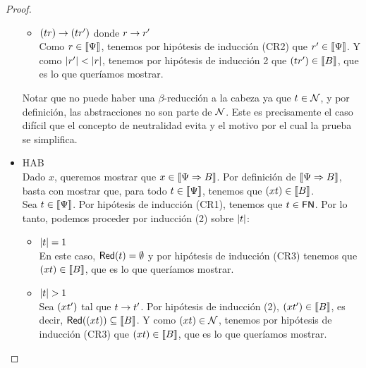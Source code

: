 \begin{proof}
\begin{itemize}
\begin{itemize}
          \item \( (t r) \rightarrow (t r') \) donde \( r \rightarrow r' \)
            \\ Como \( r \in \llbracket\Psi\rrbracket \), tenemos por hipótesis de inducción (CR2) que \( r' \in \llbracket\Psi\rrbracket \). Y como \( |r'| < |r| \), tenemos por hipótesis de inducción 2 que \( (t r') \in \llbracket B\rrbracket \), que es lo que queríamos mostrar.
        \end{itemize}
        Notar que no puede haber una \( \beta \)-reducción a la cabeza ya que \( t \in \mathcal{N} \), y por definición, las abstracciones no son parte de \( \mathcal{N} \). Este es precisamente el caso difícil que el concepto de neutralidad evita y el motivo por el cual la prueba se simplifica.
      \item HAB
        \\ Dado \( x \), queremos mostrar que \( x \in \llbracket\Psi \Rightarrow B\rrbracket \). Por definición de \( \llbracket\Psi \Rightarrow B\rrbracket \), basta con mostrar que, para todo \( t \in \llbracket\Psi\rrbracket \), tenemos que \( (x t) \in \llbracket B\rrbracket \).
        \\ Sea \( t \in \llbracket\Psi\rrbracket \). Por hipótesis de inducción (CR1), tenemos que \( t \in \mathsf{FN} \). Por lo tanto, podemos proceder por inducción (2) sobre \( |t| \):
        \begin{itemize}
          \item \( |t| = 1 \)
            \\ En este caso, \( \mathsf{Red} (t) = \emptyset \) y por hipótesis de inducción (CR3) tenemos que \( (x t) \in \llbracket B\rrbracket \), que es lo que queríamos mostrar.
          \item \( |t| > 1 \)
            \\ Sea \( (x t') \) tal que \( t \rightarrow t' \). Por hipótesis de inducción (2), \( (x t') \in \llbracket B\rrbracket \), es decir, \( \mathsf{Red} ((x t)) \subseteq \llbracket B\rrbracket \).
            Y como \( (x t) \in \mathcal{N} \), tenemos por hipótesis de inducción (CR3) que \( (x t) \in \llbracket B\rrbracket \), que es lo que queríamos mostrar.
            \qedhere
        \end{itemize}
    \end{itemize}
\end{proof}



